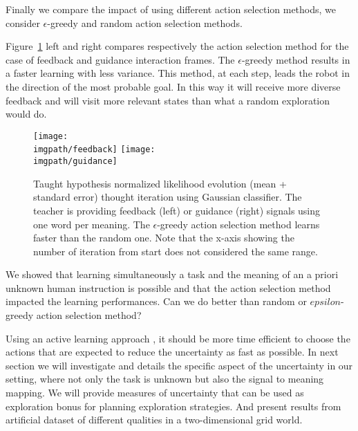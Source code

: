 Finally we compare the impact of using different action selection methods, we consider $\epsilon$-greedy and random action selection methods.

Figure~\ref{fig:selectionMethod} left and right compares respectively the action selection method for the case of feedback and guidance interaction frames. The $\epsilon$-greedy method results in a faster learning with less variance. This method, at each step, leads the robot in the direction of the most probable goal. In this way it will receive more diverse feedback and will visit more relevant states than what a random exploration would do.

\begin{figure}[!ht]
  \centering
  \texttt{[image: \\imgpath/feedback]}
  \texttt{[image: \\imgpath/guidance]}
  \caption{Taught hypothesis normalized likelihood evolution (mean + standard error) thought iteration using Gaussian classifier. The teacher is providing feedback (left) or guidance (right) signals using one word per meaning. The $\epsilon$-greedy action selection method learns faster than the random one. Note that the x-axis showing the number of iteration from start does not considered the same range.}
  \label{fig:selectionMethod}
\end{figure}


\transition

We showed that learning simultaneously a task and the meaning of an a priori unknown human instruction is possible and that the action selection method impacted the learning performances. Can we do better than random or $epsilon$-greedy action selection method? 

Using an active learning approach \cite{settles2010active}, it should be more time efficient to choose the actions that are expected to reduce the uncertainty as fast as possible. In next section we will investigate and details the specific aspect of the uncertainty in our setting, where not only the task is unknown but also the signal to meaning mapping. We will provide measures of uncertainty that can be used as exploration bonus for planning exploration strategies. And present results from artificial dataset of different qualities in a two-dimensional grid world.


